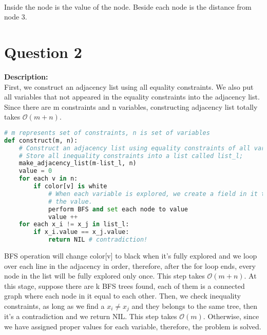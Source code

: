 \documentclass[10pt]{article}
\begin{document}
\\
Inside the node is the value of the node. Beside each node is the distance from node 3.




\section*{Question 2}
\textbf{Description:}\\
 First, we construct an adjacency list using all equality constraints. We also put all variables that not appeared in the equality constraints into the adjacency list. Since there are m constraints and n variables, constructing adjacency list totally takes $\mathcal{O}(m+n)$.\\
\begin{lstlisting}[language=Python]
# m represents set of constraints, n is set of variables
def construct(m, n):
	# Construct an adjacency list using equality constraints of all variables;
	# Store all inequality constraints into a list called list_l;
	make_adjacency_list(m-list_l, n)
	value = 0
	for each v in n:
		if color[v] is white
			# When each variable is explored, we create a field in it to store
			# the value.
			perform BFS and set each node to value
			value ++
	for each x_i != x_j in list_l:
		if x_i.value == x_j.value:
			return NIL # contradiction!
\end{lstlisting}
BFS operation will change color[v] to black when it's fully explored and we loop over each line in the adjacency in order, therefore, after the for loop ends, every node in the list will be fully explored only once. This step takes $\mathcal{O}(m+n)$. At this stage, suppose there are k BFS trees found, each of them is a connected graph where each node in it equal to each other. Then, we check inequality constraints, as long as we find a $x_i \neq x_j$ and they belongs to the same tree, then it's a contradiction and we return NIL. This step takes $\mathcal{O}(m)$. Otherwise, since we have assigned proper values for each variable, therefore, the problem is solved.
\end{document}
